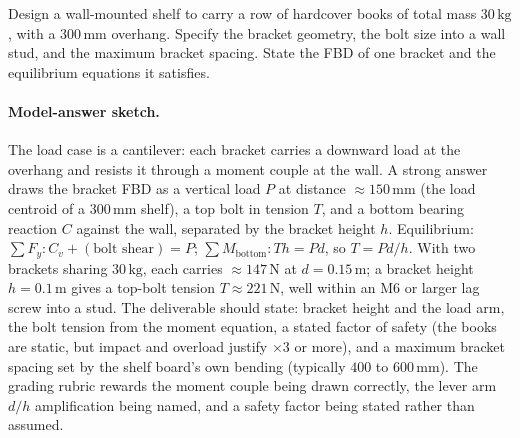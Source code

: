 \begin{exercise}
Design a wall-mounted shelf to carry a row of hardcover books of
total mass $30\,\si{\kilogram}$, with a $300\,\si{\milli\meter}$
overhang. Specify the bracket geometry, the bolt size into a wall
stud, and the maximum bracket spacing. State the FBD of one
bracket and the equilibrium equations it satisfies.
\paragraph{Model-answer sketch.} The load case is a cantilever: each
bracket carries a downward load at the overhang and resists it through a
moment couple at the wall. A strong answer draws the bracket FBD as a
vertical load $P$ at distance $\approx 150\,\si{\milli\meter}$ (the load
centroid of a $300\,\si{\milli\meter}$ shelf), a top bolt in tension
$T$, and a bottom bearing reaction $C$ against the wall, separated by the
bracket height $h$. Equilibrium: $\sum F_y: C_v + (\text{bolt shear}) =
P$; $\sum M_{\text{bottom}}: T h = P d$, so $T = Pd/h$. With two
brackets sharing $30\,\si{\kilogram}$, each carries $\approx 147\,
\text{N}$ at $d = 0.15\,\si{\meter}$; a bracket height $h = 0.1\,
\si{\meter}$ gives a top-bolt tension $T \approx 221\,\text{N}$, well
within an M6 or larger lag screw into a stud. The deliverable should
state: bracket height and the load arm, the bolt tension from the moment
equation, a stated factor of safety (the books are static, but impact
and overload justify $\times 3$ or more), and a maximum bracket spacing
set by the shelf board's own bending (typically $400$ to $600\,
\si{\milli\meter}$). The grading rubric rewards the moment couple being
drawn correctly, the lever arm $d/h$ amplification being named, and a
safety factor being stated rather than assumed.
\end{exercise}

